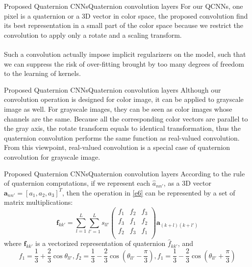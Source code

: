 \documentclass{beamer}
\begin{document}
\begin{frame}{Proposed Quaternion CNNs}{Quaternion convolution layers}
For our QCNNs, one pixel is a quaternion or a 3D vector in color space, the proposed convolution find its best representation in a small part of the color space because we restrict the convolution to apply only a rotate and a scaling transform.
\\~\\
Such a convolution actually impose implicit regularizers on the model, such that we can suppress the risk of over-fitting brought by too many degrees of freedom to the learning of kernels. 
\end{frame}

\begin{frame}{Proposed Quaternion CNNs}{Quaternion convolution layers}
Although our convolution operation is designed for color image, it can be applied to grayscale image as well. For grayscale images, they can be seen as color images whose channels are the same. Because all the corresponding color vectors are parallel to the gray axis, the rotate transform equals to identical transformation, thus the quaternion convolution performs the same function as real-valued convolution. From this viewpoint, real-valued convolution is a special case of quaternion convolution for grayscale image.
\end{frame}

\begin{frame}{Proposed Quaternion CNNs}{Quaternion convolution layers}
According to the rule of quaternion computations, if we represent each $\hat{a}_{nn'}$, as a 3D vector $\textbf{a}_{nn'}=[a_1,a_2,a_3]^T$, then the operation in \eqref{e6} can be represented by a set of matrix multiplications:
\begin{equation}
    \label{e7}
    \textbf{f}_{kk'}=\sum_{l=1}^L\sum_{l'=1}^Ls_{ll'}
    \begin{pmatrix}
        f_1&f_2&f_3\\
        f_3&f_1&f_2\\
        f_2&f_3&f_1\\
    \end{pmatrix}
    \textbf{a}_{(k+l)(k+l')}
\end{equation}
where $\textbf{f}_{kk'}$ is a vectorized representation of quaternion $\hat{f}_{kk'}$, and 
\begin{equation} 
f_1=\frac{1}{3}+\frac{2}{3}\cos\theta_{ll'},f_2=\frac{1}{3}-\frac{2}{3}\cos(\theta_{ll'}-\frac{\pi}{3}),f_1=\frac{1}{3}-\frac{2}{3}\cos(\theta_{ll'}+\frac{\pi}{3})
\end{equation}
\end{frame}
\end{document}
